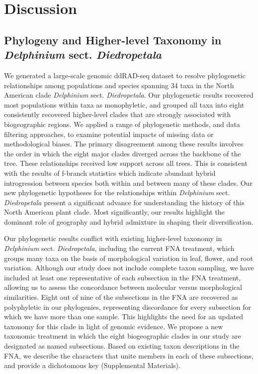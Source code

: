 \documentclass[11pt]{article}
\begin{document}
\section{Discussion}

\subsection{Phylogeny and Higher-level Taxonomy in \emph{Delphinium} sect. \emph{Diedropetala}}
We generated a large-scale genomic ddRAD-seq dataset to resolve phylogenetic 
relationships among populations and species spanning 34 taxa in the North American 
clade \emph{Delphinium} sect. \emph{Diedropetala}.
% 
Our phylogenetic results recovered most populations within taxa as monophyletic, 
and grouped all taxa into eight consistently recovered higher-level clades 
that are strongly associated with biogeographic regions.
% 
We applied a range of phylogenetic methods, and data filtering approaches,
to examine potential impacts of missing data or methodological biases.
% 
The primary disagreement among these results involves the order in which the
eight major clades diverged across the backbone of the tree. These relationships
received low support across all trees.
% 
This is consistent with the results of f-branch statistics which indicate abundant
hybrid introgression between species both within and between many of these clades.
% 
Our new phylogenetic hypotheses for the relationships within 
\emph{Delphinium} sect. \emph{Diedropetala} present a significant advance for 
understanding the history of this North American plant clade. 
Most significantly, our results highlight the dominant role of geography and 
hybrid admixture in shaping their diversification.


Our phylogenetic results conflict with existing higher-level taxonomy in 
\emph{Delphinium} sect. \emph{Diedropetala}, including the current FNA treatment,
which groups many taxa on the basis of morphological variation in leaf, flower, 
and root variation.
% 
Although our study does not include complete taxon sampling, we have
included at least one representative of each subsection in the FNA treatment, 
allowing us to assess the concordance between molecular versus morphological 
similarities.
% 
Eight out of nine of the subsections in the FNA are recovered as polyphyletic
in our phylogenies, representing discordance for every subsection for which
we have more than one sample.
This highlights the need for an updated taxonomy for this clade in light of 
genomic evidence.
% 
We propose a new taxonomic treatment in which the eight biogeographic clades 
in our study are designated as named subsections. Based on existing taxon 
descriptions in the FNA, we describe the characters that unite members in each
of these subsections, and provide a dichotomous key 
(Supplemental Materials).
\end{document}
